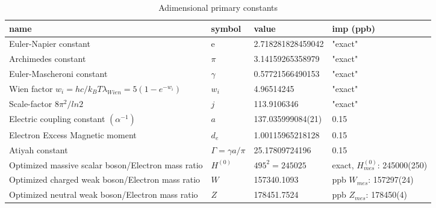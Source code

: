 \documentclass[a4paper,9pt]{article}
\newcounter{col}
\begin{document}
\begin{table}
\caption[Table \ref{tab:2:table2}: Adimensional primary constants.]{Adimensional primary constants}
\label{tab:2:table2}
  \hskip-2.0cm\begin{tabular}{llll}
    \toprule
    \cmidrule(r){1-4}
    name & symbol    & value & imp (ppb) \\
    \midrule
    
    Euler-Napier constant  & e    & 2.718281828459042 & "exact" \\    
    Archimedes constant & $\pi$    & 3.14159265358979 & "exact" \\    
    Euler-Mascheroni constant & $\gamma$    & 0.57721566490153 & "exact" \\    
    Wien factor $ w_i = hc/k_BT \lambda_{Wien} = 5(1-e^{-w_i})$ &  $w_i$  & 4.96514245  & "exact" \\
    
    Scale-factor $8\pi^2/ln2$  & $j$ & 113.9106346  &  "exact" \cite{Sanchez2} \\
     
    Electric coupling constant $(\alpha^{-1})$  & $a$    & 137.035999084(21) & 0.15 \\
    Electron Excess Magnetic moment  & $d_e$    & 1.00115965218128 & 0.15 \\
    Atiyah constant & $\Gamma= \gamma a/\pi$    & 25.17809724196  & 0.15 \\ 
    Optimized massive scalar boson/Electron mass ratio  & $H^{(0)}$ & $ 495^2 = 245025$  & exact, $H^{(0)}_{mes}$: 245000(250)  \\
    
    Optimized  charged weak  boson/Electron mass ratio  & $W$ & 157340.1093  & ppb\cite{Sanchez2} $W_{mes}$: 157297(24)  \\     
    
    Optimized  neutral weak boson/Electron mass ratio  & $Z$ & 178451.7524  & ppb\cite{Sanchez2} $Z_{mes}$: 178450(4)\\     
   

\end{tabular}
\end{table}
\end{document}
